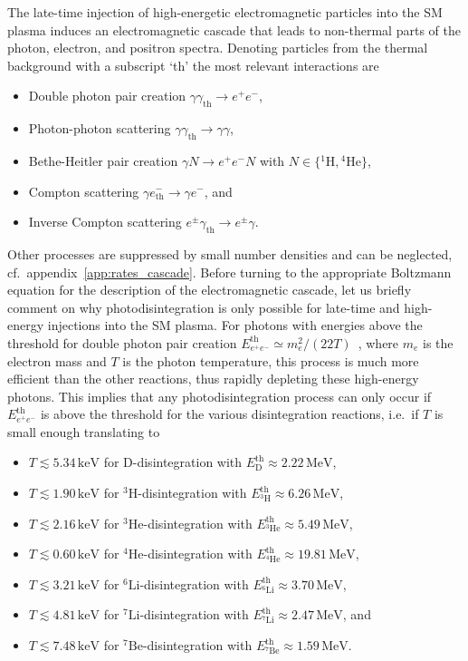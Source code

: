 \documentclass[11pt,a4paper]{article}
\begin{document}
The late-time injection of high-energetic electromagnetic particles into the SM plasma induces an electromagnetic cascade that leads to non-thermal parts of the photon, electron, and positron spectra. Denoting particles from the thermal background with a subscript `th' the most relevant interactions are
\begin{itemize}
\item Double photon pair creation $\gamma \gamma_\mathrm{th} \rightarrow e^+ e^-$,
\item Photon-photon scattering $\gamma \gamma_\mathrm{th} \rightarrow \gamma \gamma$,
\item Bethe-Heitler pair creation $\gamma N \rightarrow e^+ e^- N$ with $N \in \{{}^1 \mathrm{H}, {}^4 \mathrm{He} \}$,
\item Compton scattering $\gamma e^-_\mathrm{th} \rightarrow \gamma e^-$, and
\item Inverse Compton scattering $e^\pm \gamma_\mathrm{th} \rightarrow e^\pm \gamma$.
\end{itemize}
Other processes are suppressed by small number densities and can be neglected, cf.\ appendix~\ref{app:rates_cascade}. Before turning to the appropriate Boltzmann equation for the description of the electromagnetic cascade, let us briefly comment on why photodisintegration is only possible for late-time and high-energy injections into the SM plasma. For photons with energies above the threshold for double photon pair creation $E_{e^+ e^-}^\mathrm{th} \simeq m_e^2/(22 T)$~\cite{Kawasaki:1994sc}, where $m_e$ is the electron mass and $T$ is the photon temperature, this process is much more efficient than the other reactions, thus rapidly depleting these high-energy photons. This implies that any photodisintegration process can only occur if $E_{e^+ e^-}^\mathrm{th}$ is above the threshold for the various disintegration reactions, i.e.\ if $T$ is small enough translating to
\begin{itemize}
\item $T \lesssim 5.34 \, \mathrm{keV}$ for $\mathrm{D}$-disintegration with $E_\mathrm{D}^\mathrm{th} \approx 2.22 \, \mathrm{MeV}$,
\item $T \lesssim 1.90 \, \mathrm{keV}$ for ${}^3\mathrm{H}$-disintegration with $E_{{}^3\mathrm{H}}^\mathrm{th} \approx 6.26 \, \mathrm{MeV}$,
\item $T \lesssim 2.16 \, \mathrm{keV}$ for ${}^3\mathrm{He}$-disintegration with $E_{{}^3\mathrm{He}}^\mathrm{th} \approx 5.49 \, \mathrm{MeV}$,
\item $T \lesssim 0.60 \, \mathrm{keV}$ for ${}^4\mathrm{He}$-disintegration with $E_{{}^4\mathrm{He}}^\mathrm{th} \approx 19.81 \, \mathrm{MeV}$,
\item $T \lesssim 3.21 \, \mathrm{keV}$ for ${}^6\mathrm{Li}$-disintegration with $E_{{}^6\mathrm{Li}}^\mathrm{th} \approx 3.70 \, \mathrm{MeV}$,
\item $T \lesssim 4.81 \, \mathrm{keV}$ for ${}^7\mathrm{Li}$-disintegration with $E_{{}^7\mathrm{Li}}^\mathrm{th} \approx 2.47 \, \mathrm{MeV}$, and
\item $T \lesssim 7.48 \, \mathrm{keV}$ for ${}^7\mathrm{Be}$-disintegration with $E_{{}^7\mathrm{Be}}^\mathrm{th} \approx 1.59 \, \mathrm{MeV}$.
\end{itemize}
\end{document}

